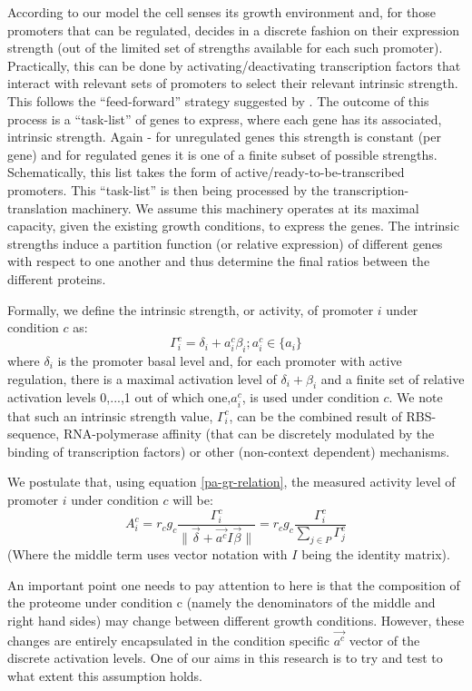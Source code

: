 \documentclass[a4page,notitlepage]{article}
\providecommand{\norm}[1]{\lVert#1\rVert}
\begin{document}
According to our model the cell senses its growth environment and, for those promoters that can be regulated, decides in a discrete fashion on their expression strength (out of the limited set of strengths available for each such promoter).
Practically, this can be done by activating/deactivating transcription factors that interact with relevant sets of promoters to select their relevant intrinsic strength.
This follows the ``feed-forward'' strategy suggested by \parencite{Levy2009}.
The outcome of this process is a ``task-list'' of genes to express, where each gene has its associated, intrinsic strength.
Again - for unregulated genes this strength is constant (per gene) and for regulated genes it is one of a finite subset of possible strengths.
Schematically, this list takes the form of active/ready-to-be-transcribed promoters.
This ``task-list'' is then being processed by the transcription-translation machinery.
We assume this machinery operates at its maximal capacity, given the existing growth conditions, to express the genes.
The intrinsic strengths induce a partition function (or relative expression) of different genes with respect to one another and thus determine the final ratios between the different proteins.

Formally, we define the intrinsic strength, or activity, of promoter $i$ under condition $c$ as:
\[\Gamma^c_i=\delta_i+a^c_i\beta_i ; a^c_i\in \{a_i\}\]
where $\delta_i$ is the promoter basal level and, for each promoter with active regulation, there is a maximal activation level of $\delta_i+\beta_i$ and a finite set of relative activation levels {0,...,1} out of which one,$a^c_i$, is used under condition $c$.
We note that such an intrinsic strength value, $\Gamma^c_i$, can be the combined result of RBS-sequence, RNA-polymerase affinity (that can be discretely modulated by the binding of transcription factors) or other (non-context dependent) mechanisms.

We postulate that, using equation \ref{pa-gr-relation}, the measured activity level of promoter $i$ under condition $c$ will be:
\begin{equation}
\label{cond-act}
A^c_i=r_cg_c\frac{\Gamma^c_i}{\norm{\vec{\delta}+\vec{a^c}I\vec{\beta}}}=r_cg_c\frac{\Gamma^c_i}{\sum_{j\in P}\Gamma^c_j}
\end{equation}
(Where the middle term uses vector notation with $I$ being the identity matrix).

An important point one needs to pay attention to here is that the composition of the proteome under condition c (namely the denominators of the middle and right hand sides) may change between different growth conditions.
However, these changes are entirely encapsulated in the condition specific $\vec{a^c}$ vector of the discrete activation levels.
One of our aims in this research is to try and test to what extent this assumption holds.
\end{document}
